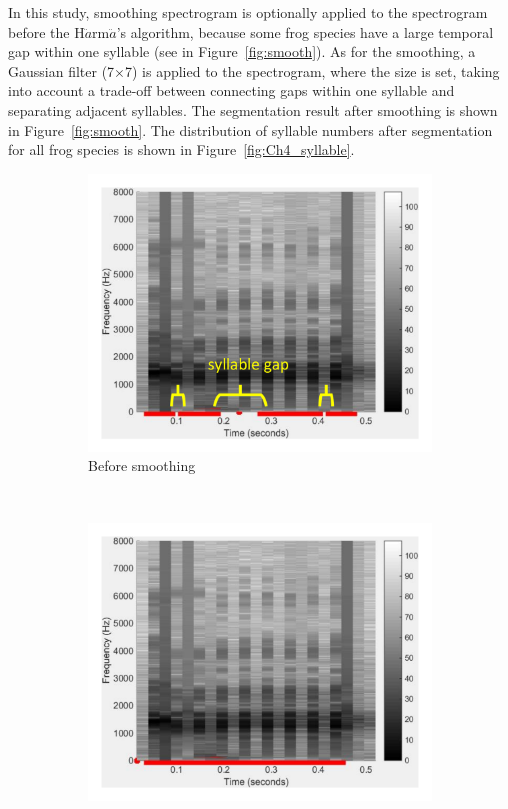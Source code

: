 In this study, smoothing spectrogram is optionally applied to the spectrogram before the H$\ddot{a}$rm$\ddot{a}$'s algorithm, because some frog species have a large temporal gap within one syllable (see in Figure~\ref{fig:smooth}). As for the smoothing, a Gaussian filter (7$\times$7) is applied to the spectrogram, where the size is set, taking into account a trade-off between connecting gaps within one syllable and separating adjacent syllables. The segmentation result after smoothing is shown in Figure~\ref{fig:smooth}. The distribution of syllable numbers after segmentation for all frog species is shown in Figure~\ref{fig:Ch4_syllable}.

\begin{figure}[htb!]
\centering
        \begin{subfigure}[b]{0.6\linewidth}
                \includegraphics[width=\textwidth]{image/Ch4/no.pdf}
                \caption{Before smoothing}
        \end{subfigure}%
        \\ 
        \begin{subfigure}[b]{0.6\linewidth}
                \includegraphics[width=\textwidth]{image/Ch4/yes.pdf}

\end{subfigure}
\end{figure}
